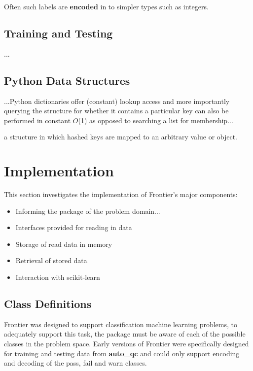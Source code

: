 Often such labels are \textbf{encoded} in to simpler types such as integers.


\subsection{Training and Testing}

...

\subsection{Python Data Structures}
\label{sec:python-structures}

...Python dictionaries offer (constant) lookup access and more importantly
querying the structure for whether it contains a particular key can also be
performed in constant $O$(1) as opposed to searching a list for
membership\citep{py:timecomplexity}...

a structure in
which hashed keys are mapped to an arbitrary value or object.


\section{Implementation}

This section investigates the implementation of Frontier's major components:

\begin{itemize}
    \item Informing the package of the problem domain...
    \item Interfaces provided for reading in data
    \item Storage of read data in memory
    \item Retrieval of stored data
    \item Interaction with scikit-learn
\end{itemize}


\subsection{Class Definitions}
\label{chap:classes}

Frontier was designed to support classification machine learning problems, to
adequately support this task, the package must be aware of each of the possible
classes in the problem space. Early versions of Frontier were specifically
designed for training and testing data from \textbf{auto\_qc} and could only
support encoding and decoding of the pass, fail and warn classes.


